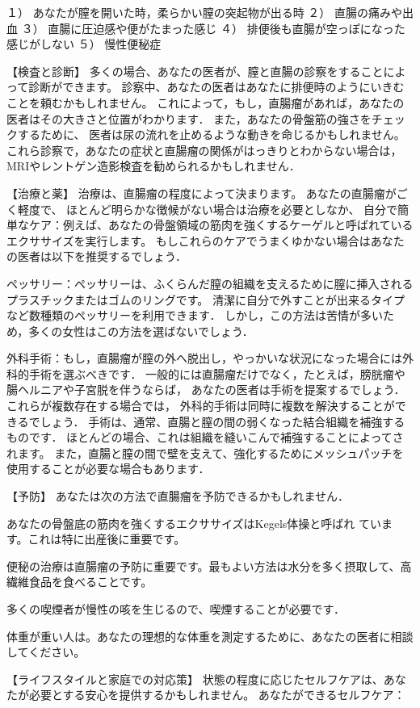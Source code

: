 １） あなたが膣を開いた時，柔らかい膣の突起物が出る時
２） 直腸の痛みや出血
３） 直腸に圧迫感や便がたまった感じ
４） 排便後も直腸が空っぽになった感じがしない
５） 慢性便秘症 

【検査と診断】
多くの場合、あなたの医者が、膣と直腸の診察をすることによって診断ができます。
診察中、あなたの医者はあなたに排便時のようにいきむことを頼むかもしれません。
これによって，もし，直腸瘤があれば，あなたの医者はその大きさと位置がわかります．
また，あなたの骨盤筋の強さをチェックするために、
医者は尿の流れを止めるような動きを命じるかもしれません。
これら診察で，あなたの症状と直腸瘤の関係がはっきりとわからない場合は，
MRIやレントゲン造影検査を勧められるかもしれません．

【治療と薬】
治療は、直腸瘤の程度によって決まります。
あなたの直腸瘤がごく軽度で、 ほとんど明らかな徴候がない場合は治療を必要としなか、
自分で簡単なケア：例えば、あなたの骨盤領域の筋肉を強くするケーゲルと呼ばれているエクササイズを実行します。
もしこれらのケアでうまくゆかない場合はあなたの医者は以下を推奨するでしょう．

ペッサリー：ペッサリーは、ふくらんだ膣の組織を支えるために膣に挿入されるプラスチックまたはゴムのリングです。
清潔に自分で外すことが出来るタイプなど数種類のペッサリーを利用できます．
しかし，この方法は苦情が多いため，多くの女性はこの方法を選ばないでしょう． 

外科手術：もし，直腸瘤が膣の外へ脱出し，やっかいな状況になった場合には外科的手術を選ぶべきです．
一般的には直腸瘤だけでなく，たとえば，膀胱瘤や腸ヘルニアや子宮脱を伴うならば，
あなたの医者は手術を提案するでしょう．これらが複数存在する場合では，
外科的手術は同時に複数を解決することができるでしょう．
手術は、通常、直腸と膣の間の弱くなった結合組織を補強するものです．
ほとんどの場合、これは組織を縫いこんで補強することによってされます。
また，直腸と膣の間で壁を支えて、強化するためにメッシュパッチを使用することが必要な場合もあります．

【予防】
あなたは次の方法で直腸瘤を予防できるかもしれません．


あなたの骨盤底の筋肉を強くするエクササイズはKegels体操と呼ばれ ています。これは特に出産後に重要です。

便秘の治療は直腸瘤の予防に重要です。最もよい方法は水分を多く摂取して、高繊維食品を食べることです。

多くの喫煙者が慢性の咳を生じるので、喫煙することが必要です．

体重が重い人は。あなたの理想的な体重を測定するために、あなたの医者に相談してください。


【ライフスタイルと家庭での対応策】
状態の程度に応じたセルフケアは、あなたが必要とする安心を提供するかもしれません。
あなたができるセルフケア：


